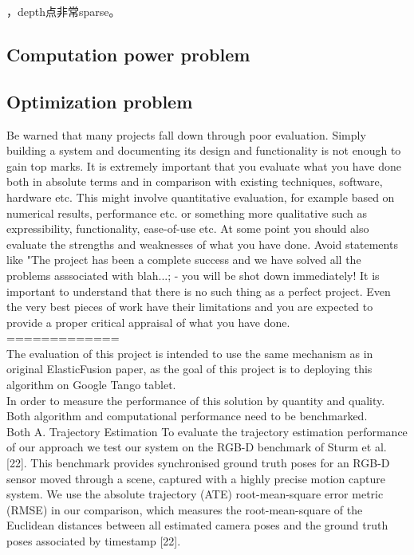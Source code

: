 \documentclass[12pt,twoside]{article}
\begin{document}
，depth点非常sparse。








\subsection{Computation power problem}











\subsection{Optimization problem}

Be warned that many projects fall down through poor evaluation. Simply building a system and documenting its design and functionality is not enough to gain top marks. It is extremely important that you evaluate what you have done both in absolute terms and in comparison with existing techniques, software, hardware etc. This might involve quantitative evaluation, for example based on numerical results, performance etc. or something more qualitative such as expressibility, functionality, ease-of-use etc. At some point you should also evaluate the strengths and weaknesses of what you have done. Avoid statements like "The project has been a complete success and we have solved all the problems asssociated with blah...; - you will be shot down immediately! It is important to understand that there is no such thing as a perfect project. Even the very best pieces of work have their limitations and you are expected to provide a proper critical appraisal of what you have done.\\

=============\\




The evaluation of this project is intended to use the same mechanism as in original ElasticFusion\citep{whelan2016elasticfusion} paper, as the goal of this project is to deploying this algorithm on Google Tango tablet.\\
In order to measure the performance of this solution by quantity and quality. Both algorithm and computational performance need to be benchmarked.\\
Both
A. Trajectory Estimation
To evaluate the trajectory estimation performance of our approach
we test our system on the RGB-D benchmark of Sturm
et al. [22]. This benchmark provides synchronised ground truth
poses for an RGB-D sensor moved through a scene, captured
with a highly precise motion capture system.  We use the absolute
trajectory (ATE) root-mean-square error metric (RMSE) in
our comparison, which measures the root-mean-square of the
Euclidean distances between all estimated camera poses and
the ground truth poses associated by timestamp [22].
\end{document}
